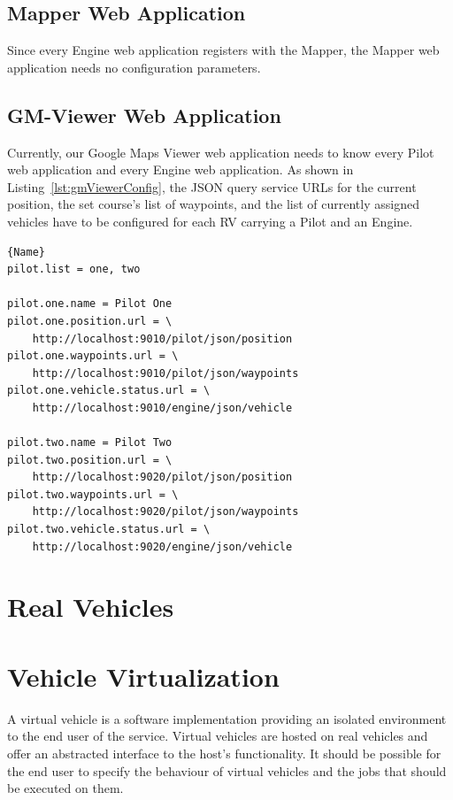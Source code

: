 \subsection{Mapper Web Application}
Since every Engine web application registers with the Mapper, the Mapper web application needs no
configuration parameters.



\subsection{GM-Viewer Web Application}
Currently, our Google Maps Viewer web application needs to know every Pilot web application
and every Engine web application. As shown in Listing~\ref{lst:gmViewerConfig}, the \acs{JSON} \cite{RFC_4627}
query service \acsp{URL} for the current position, the set course's list of waypoints, and the  
list of currently assigned vehicles have to be configured for each \ac{RV} carrying a Pilot and an Engine.   

\lstset{tabsize=3,language=Tex}
\begin{lstlisting}[caption={Google Maps Viewer Configuration Example},mathescape=true,label=lst:gmViewerConfig]{Name}
pilot.list = one, two

pilot.one.name = Pilot One
pilot.one.position.url = \
	http://localhost:9010/pilot/json/position
pilot.one.waypoints.url = \
	http://localhost:9010/pilot/json/waypoints
pilot.one.vehicle.status.url = \
	http://localhost:9010/engine/json/vehicle

pilot.two.name = Pilot Two
pilot.two.position.url = \
	http://localhost:9020/pilot/json/position
pilot.two.waypoints.url = \
	http://localhost:9020/pilot/json/waypoints
pilot.two.vehicle.status.url = \
	http://localhost:9020/engine/json/vehicle
\end{lstlisting}



\section{Real Vehicles}


\section{Vehicle Virtualization}

A virtual vehicle is a software implementation providing an isolated environment to the end user of the service. Virtual vehicles are hosted on real vehicles and offer an abstracted interface to the host's functionality. It should be possible for the end user to specify the behaviour of virtual vehicles and the jobs that should be executed on them.

